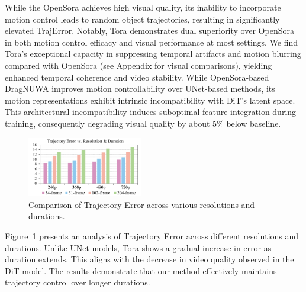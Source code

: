 While the OpenSora achieves high visual quality, its inability to incorporate motion control leads to random object trajectories, resulting in significantly elevated TrajError. Notably, Tora demonstrates dual superiority over OpenSora in both motion control efficacy and visual performance at most settings. We find Tora's exceptional capacity in suppressing temporal artifacts and motion blurring compared with OpenSora (see Appendix for visual comparisons), yielding enhanced temporal coherence and video stability. While OpenSora-based DragNUWA improves motion controllability over UNet-based methods, its motion representations exhibit intrinsic incompatibility with DiT's latent space. This architectural incompatibility induces suboptimal feature integration during training, consequently degrading visual quality by about 5$\%$ below baseline. 

\begin{figure}[!t]
    \centering
    \includegraphics[width=0.45\textwidth]{images/dz.pdf}
    \caption{
        Comparison of Trajectory Error across various resolutions and durations. %
    }
    \label{fig:5}   
\end{figure}

Figure~\ref{fig:5} presents an analysis of Trajectory Error across different resolutions and durations. Unlike UNet models, Tora shows a gradual increase in error as duration extends. This aligns with the decrease in video quality observed in the DiT model. The results demonstrate that our method effectively maintains trajectory control over longer durations.



